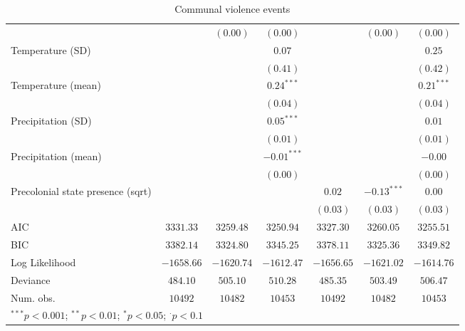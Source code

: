 \begin{sidewaystable}
\begin{center}
{\begin{tabular}{l c c c c c c}
                                  &               & $(0.00)$       & $(0.00)$      &               & $(0.00)$      & $(0.00)$      \\
Temperature (SD)                  &               &                & $0.07$        &               &               & $0.25$        \\
                                  &               &                & $(0.41)$      &               &               & $(0.42)$      \\
Temperature (mean)                &               &                & $0.24^{***}$  &               &               & $0.21^{***}$  \\
                                  &               &                & $(0.04)$      &               &               & $(0.04)$      \\
Precipitation (SD)                &               &                & $0.05^{***}$  &               &               & $0.01$        \\
                                  &               &                & $(0.01)$      &               &               & $(0.01)$      \\
Precipitation (mean)              &               &                & $-0.01^{***}$ &               &               & $-0.00$       \\
                                  &               &                & $(0.00)$      &               &               & $(0.00)$      \\
Precolonial state presence (sqrt) &               &                &               & $0.02$        & $-0.13^{***}$ & $0.00$        \\
                                  &               &                &               & $(0.03)$      & $(0.03)$      & $(0.03)$      \\
\hline
AIC                               & $3331.33$     & $3259.48$      & $3250.94$     & $3327.30$     & $3260.05$     & $3255.51$     \\
BIC                               & $3382.14$     & $3324.80$      & $3345.25$     & $3378.11$     & $3325.36$     & $3349.82$     \\
Log Likelihood                    & $-1658.66$    & $-1620.74$     & $-1612.47$    & $-1656.65$    & $-1621.02$    & $-1614.76$    \\
Deviance                          & $484.10$      & $505.10$       & $510.28$      & $485.35$      & $503.49$      & $506.47$      \\
Num. obs.                         & $10492$       & $10482$        & $10453$       & $10492$       & $10482$       & $10453$       \\
\hline
\multicolumn{7}{l}{\scriptsize{$^{***}p<0.001$; $^{**}p<0.01$; $^{*}p<0.05$; $^{\cdot}p<0.1$}}
\end{tabular}
}
\caption{Communal violence events}
\label{org3Full}
\end{center}
\end{sidewaystable}
